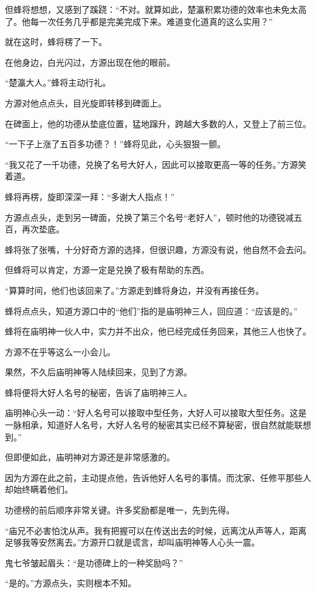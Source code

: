 \begin{this_body}
但蜂将想想，又感到了蹊跷：“不对。就算如此，楚瀛积累功德的效率也未免太高了。他每一次任务几乎都是完美完成下来。难道变化道真的这么实用？”

就在这时，蜂将楞了一下。

在他身边，白光闪过，方源出现在他的眼前。

“楚瀛大人。”蜂将主动行礼。

方源对他点点头，目光旋即转移到碑面上。

在碑面上，他的功德从垫底位置，猛地蹿升，跨越大多数的人，又登上了前三位。

“一下子上涨了五百多功德？！”蜂将见此，心头狠狠一颤。

“我又花了一千功德，兑换了名号大好人，因此可以接取更高一等的任务。”方源笑着道。

蜂将再楞，旋即深深一拜：“多谢大人指点！”

方源点点头，走到另一碑面，兑换了第三个名号“老好人”，顿时他的功德锐减五百，再次垫底。

蜂将张了张嘴，十分好奇方源的选择，但很识趣，方源没有说，他自然不会去问。

但蜂将可以肯定，方源一定是兑换了极有帮助的东西。

“算算时间，他们也该回来了。”方源走到蜂将身边，并没有再接任务。

蜂将点点头，知道方源口中的“他们”指的是庙明神三人，回应道：“应该是的。”

蜂将在庙明神一伙人中，实力并不出众，他已经完成任务回来，其他三人也快了。

方源不在乎等这么一小会儿。

果然，不久后庙明神等人陆续回来，见到了方源。

蜂将便将大好人名号的秘密，告诉了庙明神三人。

庙明神心头一动：“好人名号可以接取中型任务，大好人可以接取大型任务。这是一脉相承，知道好人名号，大好人名号的秘密其实已经不算秘密，很自然就能联想到。”

但即便如此，庙明神对方源还是非常感激的。

因为方源在此之前，主动提点他，告诉他好人名号的事情。而沈家、任修平那些人却始终瞒着他们。

功德榜的前后顺序非常关键。许多奖励都是唯一，先到先得。

“庙兄不必害怕沈从声。我有把握可以在传送出去的时候，远离沈从声等人，距离足够我等安然离去。”方源开口就是谎言，却叫庙明神等人心头一震。

鬼七爷皱起眉头：“是功德碑上的一种奖励吗？”

“是的。”方源点头，实则根本不知。


\end{this_body}
